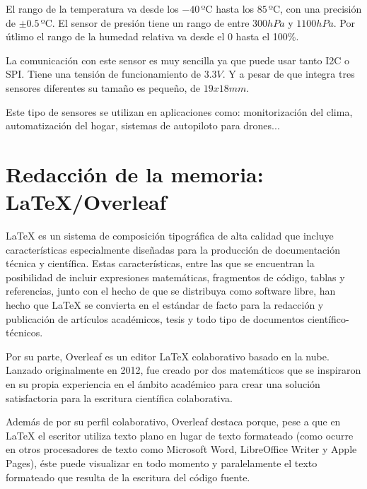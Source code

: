 \documentclass[a4paper, 12pt]{book}
\begin{document}
El rango de la temperatura va desde los $-40\, \mbox{ºC}$ hasta los $85\, \mbox{ºC}$, con una precisión de $\pm 0.5\, \mbox{ºC}$. El sensor de presión tiene un rango de entre $300 hPa$ y $1100 hPa$. Por útlimo el rango de la humedad relativa va desde el 0 hasta el 100\%.

La comunicación con este sensor es muy sencilla ya que puede usar tanto I2C o SPI. Tiene una tensión de funcionamiento de $3.3V$. Y a pesar de que integra tres sensores diferentes su tamaño es pequeño, de $19x18 mm$.

Este tipo de sensores se utilizan en aplicaciones como: monitorización del clima, automatización del hogar, sistemas de autopiloto para drones...

\section{Redacción de la memoria: LaTeX/Overleaf}
\label{sec:redaccion_de_la_memoria}

LaTeX es un sistema de composición tipográfica de alta calidad que incluye características especialmente diseñadas para la producción de documentación técnica y científica. Estas características, entre las que se encuentran la posibilidad de incluir expresiones matemáticas, fragmentos de código, tablas y referencias, junto con el hecho de que se distribuya como software libre, han hecho que LaTeX se convierta en el estándar de facto para la redacción y publicación de artículos académicos, tesis y todo tipo de documentos científico-técnicos. 

Por su parte, Overleaf es un editor LaTeX colaborativo basado en la nube. Lanzado originalmente en 2012, fue creado por dos matemáticos que se inspiraron en su propia experiencia en el ámbito académico para crear una solución satisfactoria para la escritura científica colaborativa.

Además de por su perfil colaborativo, Overleaf destaca porque, pese a que en LaTeX el escritor utiliza texto plano en lugar de texto formateado (como ocurre en otros procesadores de texto como Microsoft Word, LibreOffice Writer y Apple Pages), éste puede visualizar en todo momento y paralelamente el texto formateado que resulta de la escritura del código fuente.

\cleardoublepage

\end{document}
